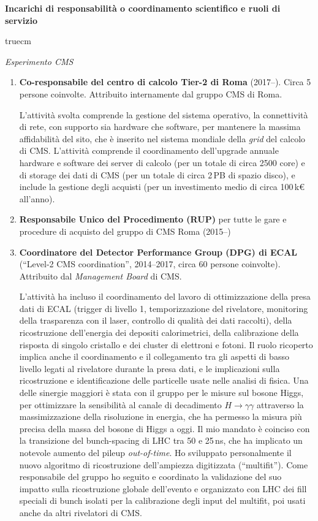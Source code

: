 \documentclass[11pt,twoside,a4paper]{article}
\begin{document}
\begin{center}
\textbf{Incarichi di responsabilit\`a o coordinamento scientifico e ruoli di servizio}
\end{center}
 truecm

\textit{Esperimento CMS}
\begin{enumerate}
\item \textbf{Co-responsabile del centro di calcolo Tier-2 di Roma}
  (2017--). Circa 5 persone coinvolte. Attribuito internamente dal
  gruppo CMS di Roma.

  L'attivit\`a svolta comprende la gestione del sistema operativo, la
  connettivit\`a di rete, con supporto sia hardware che software, per
  mantenere la massima affidabilit\`a del sito, che \`e inserito nel
  sistema mondiale della \textit{grid} del calcolo di CMS.
  L'attivit\`a comprende il coordinamento dell'upgrade annuale
  hardware e software dei server di calcolo (per un totale di circa
  2500 core) e di storage dei dati di CMS (per un totale di circa
  2\,PB di spazio disco), e include la gestione degli acquisti (per un
  investimento medio di circa 100\,k\euro{} all'anno).

\item \textbf{Responsabile Unico del Procedimento (RUP)} per tutte le gare e
  procedure di acquisto del gruppo di CMS Roma (2015--)

\item \textbf{Coordinatore del Detector Performance Group (DPG) di ECAL}
  (``Level-2 CMS coordination'', 2014--2017, circa 60 persone
  coinvolte). Attribuito dal \textit{Management Board} di CMS.

  L'attivit\`a ha incluso il coordinamento del lavoro di
  ottimizzazione della presa dati di ECAL (trigger di livello 1,
  temporizzazione del rivelatore, monitoring della trasparenza con il
  laser, controllo di qualit\`a dei dati raccolti), della
  ricostruzione dell'energia dei depositi calorimetrici, della
  calibrazione della risposta di singolo cristallo e dei cluster di
  elettroni e fotoni. Il ruolo ricoperto implica anche il
  coordinamento e il collegamento tra gli aspetti di basso livello
  legati al rivelatore durante la presa dati, e le implicazioni sulla
  ricostruzione e identificazione delle particelle usate nelle analisi
  di fisica. Una delle sinergie maggiori \`e stata con il gruppo per
  le misure sul bosone Higgs, per ottimizzare la sensibilit\`a al
  canale di decadimento $H\to\gamma\gamma$ attraverso la
  massimizzazione della risoluzione in energia, che ha permesso la
  misura pi\`u precisa della massa del bosone di Higgs a oggi. Il mio
  mandato \`e coinciso con la transizione del bunch-spacing di LHC tra
  50 e 25\,ns, che ha implicato un notevole aumento del pileup
  \textit{out-of-time}.  Ho sviluppato personalmente il nuovo
  algoritmo di ricostruzione dell'ampiezza digitizzata
  (``multifit''). Come responsabile del gruppo ho seguito e coordinato
  la validazione del suo impatto sulla ricostruzione globale
  dell'evento e organizzato con LHC dei fill speciali di bunch isolati
  per la calibrazione degli input del multifit, poi usati anche da
  altri rivelatori di CMS.


\end{enumerate}
\end{document}
